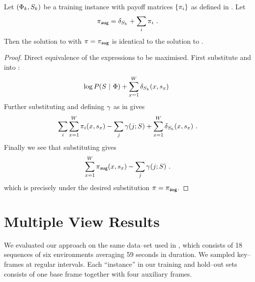 \begin{proposition}
  Let $(\Features_k,\Seam_k)$ be a training instance with payoff
  matrices $\{\PixelPayoff_i\}$ as defined in .
  Let
  \begin{equation}
    \AugPayoff = \LossMat_{\Seam_k} + \sum_i \PixelPayoff_i ~.
    \label{eq:aug-payoff}
  \end{equation}
  Then the solution to  with
  $\PixelPayoff=\AugPayoff$ is identical to the solution to
  .
\end{proposition}
\begin{proof}
  Direct equivalence of the expressions to be maximised. First
  substitute  and
   into :
  \begin{equation}
    \log P(\Seam ~|~ \Features) +
    \sum_{x=1}^{\Width} \LossMat_{\Seam_k}(x,\seam_x) ~
  \end{equation}
  Further substituting  and defining
  $\CornerPenalty$ as in  gives
  \begin{equation}
    \sum_i \sum_{x=1}^{\Width} \PixelPayoff_i(x,\seam_x) - 
    \sum_j \CornerPenalty(j;\Seam) +
    \sum_{x=1}^{\Width} \LossMat_{\Seam_k}(x,\seam_x) ~.
  \end{equation}
  Finally we see that substituting  gives
  \begin{equation}
    \sum_{x=1}^{\Width} \AugPayoff(x,\seam_x) - 
    \sum_j \CornerPenalty(j;\Seam)~.
  \end{equation}
  which is precisely  under the desired
  substitution $\PixelPayoff=\AugPayoff$.
\end{proof}

\section{Multiple View Results}
\label{sec:mv-results}

\newcommand\Fsviewdepth{f^{\textsf{sview}}_{\textsf{depth}}}
\newcommand\Fsviewlbl{f^{\textsf{sview}}_{\textsf{labelling}}}
\newcommand\Fmviewdepth{f^{\textsf{mview}}_{\textsf{depth}}}
\newcommand\Fmviewlbl{f^{\textsf{mview}}_{\textsf{labelling}}}

We evaluated our approach on the same data--set used in ,
which consists of 18 sequences of six environments averaging 59
seconds in duration. We sampled key--frames at regular intervals. Each
``instance'' in our training and hold--out sets consists of one base
frame together with four auxiliary frames.

